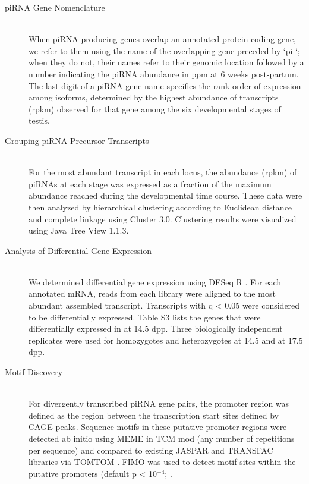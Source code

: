 \begin{description}
    \item[piRNA Gene Nomenclature] \hfill \\
    When piRNA-producing genes overlap an annotated protein coding gene, we refer to them using the name of the overlapping gene preceded by ‘pi-‘; when they do not, their names refer to their genomic location followed by a number indicating the piRNA abundance in ppm at 6 weeks post-partum. The last digit of a piRNA gene name specifies the rank order of expression among isoforms, determined by the highest abundance of transcripts (rpkm) observed for that gene among the six developmental stages of testis.

    \item[Grouping piRNA Precursor Transcripts] \hfill \\
    For the most abundant transcript in each locus, the abundance (rpkm) of piRNAs at each stage was expressed as a fraction of the maximum abundance reached during the developmental time course. These data were then analyzed by hierarchical clustering according to Euclidean distance and complete linkage using Cluster 3.0. Clustering results were visualized using Java Tree View 1.1.3.

    \item[Analysis of Differential Gene Expression ] \hfill \\
    We determined differential gene expression using DESeq R \citep{Anders2010a}. For each annotated mRNA, reads from each library were aligned to the most abundant assembled transcript. Transcripts with q < 0.05 were considered to be differentially expressed. Table S3 lists the genes that were differentially expressed in \amyb{} at 14.5 dpp. Three biologically independent replicates were used for \amyb homozygotes and heterozygotes at 14.5 and at 17.5 dpp.

    \item[Motif Discovery] \hfill \\
    For divergently transcribed piRNA gene pairs, the promoter region was defined as the region between the transcription start sites defined by CAGE peaks. Sequence motifs in these putative promoter regions were detected ab initio using MEME \citep{Bailey1994, Bailey2009} in TCM mod (any number of repetitions per sequence) and compared to existing JASPAR and TRANSFAC libraries via TOMTOM \citep{Gupta2007}. FIMO was used to detect motif sites within the putative promoters (default p < 10$^{-4}$; \citep{Grant2011}.


\end{description}
